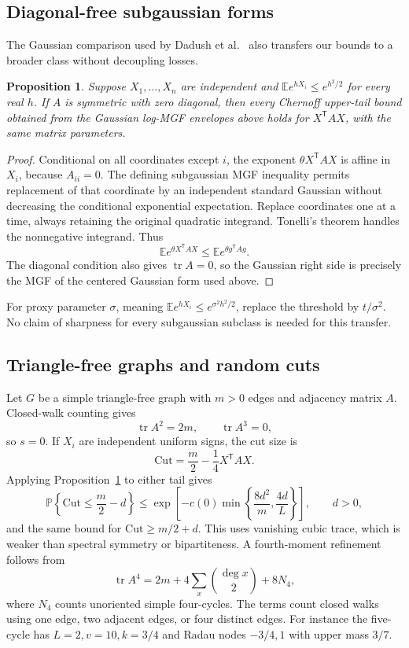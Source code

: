 \documentclass[11pt,letterpaper]{article}
\numberwithin{equation}{section}
\newtheorem{proposition}[theorem]{Proposition}
\theoremstyle{definition}\newtheorem{definition}[theorem]{Definition}
\theoremstyle{remark}\newtheorem{remark}[theorem]{Remark}
\newcommand{\E}{\mathbb E}
\newcommand{\PP}{\mathbb P}
\newcommand{\tr}{\operatorname{tr}}
\begin{document}
\subsection{Diagonal-free subgaussian forms}
The Gaussian comparison used by Dadush et al.~\cite{DGO} also transfers
our bounds to a broader class without decoupling losses.

\begin{proposition}\label{prop:subgaussian}
Suppose $X_1,\ldots,X_n$ are independent and
$\E e^{hX_i}\le e^{h^2/2}$ for every real $h$. If $A$ is symmetric
with zero diagonal, then every Chernoff upper-tail bound obtained from
the Gaussian log-MGF envelopes above holds for $X^{\mathsf T}AX$,
with the same matrix parameters.
\end{proposition}
\begin{proof}
Conditional on all coordinates except $i$, the exponent
$\theta X^{\mathsf T}AX$ is affine in $X_i$, because $A_{ii}=0$.
The defining subgaussian MGF inequality permits replacement of that
coordinate by an independent standard Gaussian without decreasing
the conditional exponential expectation. Replace coordinates one
at a time, always retaining the original quadratic integrand.
Tonelli's theorem handles the nonnegative integrand. Thus
\[
 \E e^{\theta X^{\mathsf T}AX}\le
 \E e^{\theta g^{\mathsf T}Ag}.
\]
The diagonal condition also gives $\tr A=0$, so the Gaussian
right side is precisely the MGF of the centered Gaussian form used above.
\end{proof}
For proxy parameter $\sigma$, meaning
$\E e^{hX_i}\le e^{\sigma^2h^2/2}$, replace the threshold by
$t/\sigma^2$. No claim of sharpness for every subgaussian subclass
is needed for this transfer.

\subsection{Triangle-free graphs and random cuts}
Let $G$ be a simple triangle-free graph with $m>0$ edges and
adjacency matrix $A$. Closed-walk counting gives
\begin{equation}
 \tr A^2=2m,\qquad \tr A^3=0,
\end{equation}
so $s=0$. If $X_i$ are independent uniform signs, the cut size is
\[
 \mathrm{Cut}=\frac m2-\frac14X^{\mathsf T}AX.
\]
Applying Proposition~\ref{prop:subgaussian} to either tail gives
\begin{equation}\label{eq:cut}
 \PP\!\left\{\mathrm{Cut}\le\frac m2-d\right\}
 \le\exp\!\left[-c(0)\min\left\{\frac{8d^2}{m},\frac{4d}{L}\right\}\right],
 \qquad d>0,
\end{equation}
and the same bound for $\mathrm{Cut}\ge m/2+d$.
This uses vanishing cubic trace, which is weaker than spectral
symmetry or bipartiteness. A fourth-moment refinement follows from
\begin{equation}
 \tr A^4=2m+4\sum_x\binom{\deg x}{2}+8N_4,
\end{equation}
where $N_4$ counts unoriented simple four-cycles. The terms count
closed walks using one edge, two adjacent edges, or four distinct edges.
For instance the five-cycle has $L=2,v=10,k=3/4$ and Radau nodes
$-3/4,1$ with upper mass $3/7$.
\end{document}
